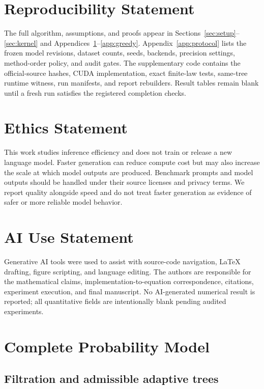 \documentclass{article}
\begin{document}
\section*{Reproducibility Statement}
The full algorithm, assumptions, and proofs appear in Sections~\ref{sec:setup}--\ref{sec:kernel} and Appendices~\ref{app:fullproof}--\ref{app:greedy}.  Appendix~\ref{app:protocol} lists the frozen model revisions, dataset counts, seeds, backends, precision settings, method-order policy, and audit gates.  The supplementary code contains the official-source hashes, CUDA implementation, exact finite-law tests, same-tree runtime witness, run manifests, and report rebuilders.  Result tables remain blank until a fresh run satisfies the registered completion checks.

\section*{Ethics Statement}
This work studies inference efficiency and does not train or release a new language model.  Faster generation can reduce compute cost but may also increase the scale at which model outputs are produced.  Benchmark prompts and model outputs should be handled under their source licenses and privacy terms.  We report quality alongside speed and do not treat faster generation as evidence of safer or more reliable model behavior.




\section*{AI Use Statement}
Generative AI tools were used to assist with source-code navigation, LaTeX drafting, figure scripting, and language editing.  The authors are responsible for the mathematical claims, implementation-to-equation correspondence, citations, experiment execution, and final manuscript.  No AI-generated numerical result is reported; all quantitative fields are intentionally blank pending audited experiments.

\clearpage
\appendix

\section{Complete Probability Model}
\label{app:fullproof}

\subsection{Filtration and admissible adaptive trees}
\end{document}
